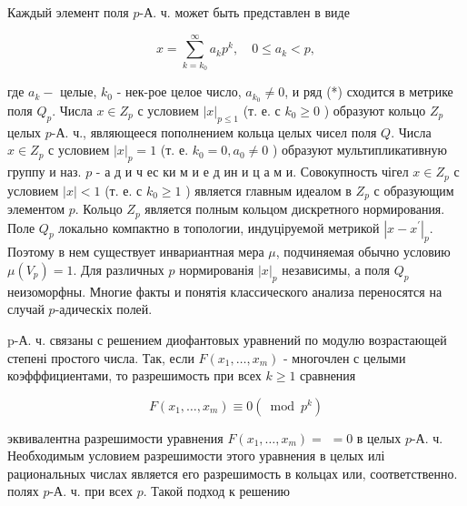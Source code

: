 \documentclass[10pt]{article}
\begin{document}
Каждый элемент поля $p$-А. ч. может быть представлен в виде



\[

x=\sum_{k=k_{0}}^{\infty} a_{k} p^{k}, \quad 0 \leqslant a_{k}<p,

\]



где $a_{k}-$ целые, $k_{0}$ - нек-рое целое число, $a_{k_{0}} \neq 0$, и ряд (*) сходится в метрике поля $Q_{p}$. Числа $x \in Z_{p}$ с условием $|x|_{p \leqslant 1}$ (т. е. с $k_{0} \geqslant 0$ ) образуют кольцо $Z_{p}$ целых $p$-А. ч., являющееся пополнением кольца целых чисел поля $Q$. Числа $x \in Z_{p}$ с условием $|x|_{p}=1$ (т. е. $k_{0}=0, a_{0} \neq 0$ ) образуют мультипликативную группу и наз. $p$ - а д и ч ес ки м и е д ин и ц а м и. Совокупность чігел $x \in Z_{p}$ с условием $|x|<1$ (т. е. с $k_{0} \geqslant 1$ ) является главным идеалом в $Z_{p}$ с образующим элементом $p$. Кольцо $Z_{p}$ является полным кольцом дискретного нормирования. Поле $Q_{p}$ локально компактно в топологии, индуціруемой метрикой $\left|x-x^{\prime}\right|_{p}$. Поэтому в нем существует инвариантная мера $\mu$, подчиняемая обычно условию $\mu\left(V_{p}\right)=1$. Для различных $p$ нормированія $|x|_{p}$ независимы, а поля $Q_{p}$ неизоморфны. Многие факты и понятія классического анализа переносятся на случай $p$-адическіх полей.



p-А. ч. связаны с решением диофантовых уравнений по модулю возрастающей степені простого числа. Так, если $F\left(x_{1}, \ldots, x_{m}\right)$ - многочлен с целыми коэфффициентами, то разрешимость при всех $k \geqslant 1$ сравнения



\[

F\left(x_{1}, \ldots, x_{m}\right) \equiv 0\left(\bmod p^{k}\right)

\]



эквивалентна разрешимости уравнения $F\left(x_{1}, \ldots, x_{m}\right)=$ $=0$ в целых $p$-А. ч. Необходимым условием разрешимости этого уравнения в целых илі рациональных числах является его разрешимость в кольцах или, соответственно. полях $p$-А. ч. при всех $p$. Такой подход к решению
\end{document}
